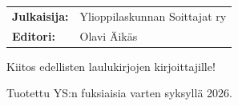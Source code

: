 \newdoublepage


\thispagestyle{empty}

\begin{footnotesize}
	
	\newlength{\currentparskip}
	\setlength{\currentparskip}{\parskip} %
	
	\null
	\vfill
	\begin{minipage}{\textwidth}
	
	    \setlength{\parskip}{\currentparskip} %
	    
	    \begin{tabular}{l l}
			\textbf{Julkaisija:}			& Ylioppilaskunnan Soittajat ry \\
			\textbf{Editori:}               & Olavi Äikäs
	    \end{tabular}
	    
	    \vspace{.2cm}
	    
	    Kiitos edellisten laulukirjojen kirjoittajille!

        Tuotettu YS:n fuksiaisia varten syksyllä 2026.
	
	\end{minipage}
		
\end{footnotesize}








	

	
	
